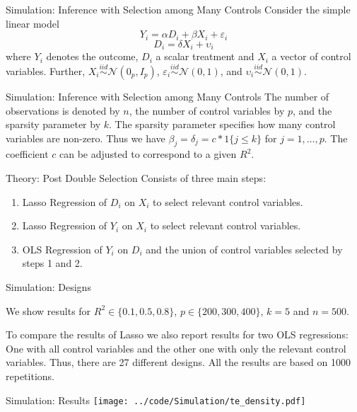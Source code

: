 \documentclass[serif,professionalfont]{beamer}
\begin{document}
\begin{frame}{Simulation: Inference with Selection among Many Controls}
	Consider the simple linear model
	\[Y_i = \alpha D_i + \beta X_i + \varepsilon_i\]
	\[D_i = \delta X_i + \upsilon_i\]
	where \(Y_i\) denotes the outcome, \(D_i\) a scalar treatment and \(X_i\) a vector of control variables. Further, \(X_i \stackrel{iid}{\sim} \mathcal{N}(0_p,I_p)\), \(\varepsilon_i \stackrel{iid}{\sim} \mathcal{N}(0,1)\), and \(\upsilon_i \stackrel{iid}{\sim} \mathcal{N}(0,1)\). 	
\end{frame}

\begin{frame}{Simulation: Inference with Selection among Many Controls}
	The number of observations is denoted by \(n\), the number of control variables by \(p\), and the sparsity parameter by \(k\). The sparsity parameter specifies how many control variables are non-zero. Thus we have \(\beta_j = \delta_j = c * 1\{j \leq k\}\) for \(j = 1,\ldots,p\). The coefficient \(c\) can be adjusted to correspond to a given \(R^2\). 	
\end{frame}

\begin{frame}{Theory: Post Double Selection}
	Consists of three main steps:
	\begin{enumerate}
		\item Lasso Regression of \(D_i\) on \(X_i\) to select relevant control variables.
		\item Lasso Regression of \(Y_i\) on \(X_i\) to select relevant control variables.
		\item OLS Regression of \(Y_i\) on \(D_i\) and the union of control variables selected by steps 1 and 2.
	\end{enumerate}
	\end{frame}

\begin{frame}{Simulation: Designs}
\begin{flushleft}
	We show results for \(R^2 \in \{0.1,0.5,0.8\}\), \(p \in \{200,300,400\}\), \(k = 5\) and \(n = 500\).

To compare the results of Lasso we also report results for two OLS regressions: One with all control variables and the other one with only the relevant control variables. Thus, there are 27 different designs. All the results are based on 1000 repetitions.
\end{flushleft}
\end{frame}

\begin{frame}{Simulation: Results}
	\texttt{[image: ../code/Simulation/te\_density.pdf]}	
\end{frame}
\end{document}
